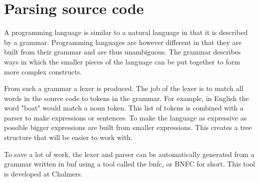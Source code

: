 \section{Parsing source code} \label{sec:bnfc}

A programming language is similar to a natural language in that it is described by a grammar. Programming languages are however different in that they are built from their grammar and are thus unambiguous. The grammar describes ways in which the smaller pieces of the language can be put together to form more complex constructs.

From such a grammar a lexer is produced. The job of the lexer is to match all words in the source code to tokens in the grammar. For example, in English the word "boat" would match a noun token. This list of tokens is combined with a parser to make expressions or sentences. To make the language as expressive as possible bigger expressions are built from smaller expressions. This creates a tree structure that will be easier to work with. 

To save a lot of work, the lexer and parser can be automatically generated from a grammar written in \gls{bnf} using a tool called the \gls{bnfc}\cite{bnfc}, or BNFC for short. This tool is developed at Chalmers.
